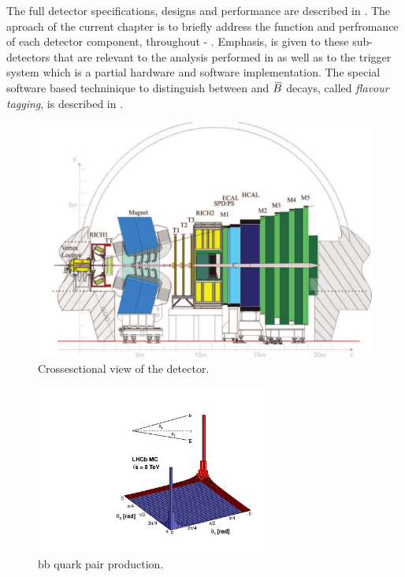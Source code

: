 The full \lhcb detector specifications, designs and performance are described in \cite{jnst}.
The aproach of the current chapter is to briefly address the function and perfromance of each detector component,
throughout  - . Emphasis, is given to these sub-detectors that are relevant
to the analysis performed in  as well as to the trigger system which is a partial hardware
and software implementation. The special software based techninique to distinguish between \B and $\kern 0.18em\overline{\kern -0.18em B}{}$ decays, called
{\it flavour tagging}, is described in \secref{}.

\begin{figure}[t]
  \centering
  \includegraphics[width=\textwidth]{Figures/Chapter2/detector_cross_cmyk}
  \caption{Crossesctional view of the \lhcb detector.}
  \label{lhcb_detector_cross_section}
\end{figure}

\begin{figure}[t]
  \centering
  \includegraphics[width=0.7\textwidth]{Figures/Chapter2/08_rad_acc_scheme_right}
  \caption{bb quark pair production.}
  \label{bb_roduction_angles}
\end{figure}
